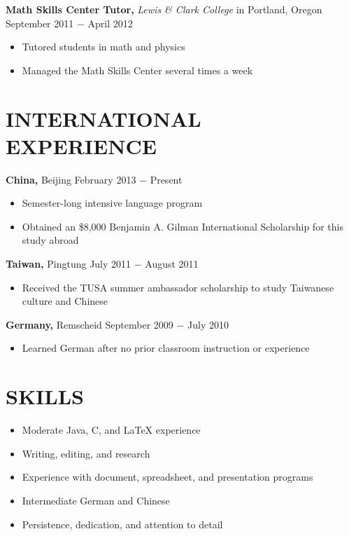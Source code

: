 \documentclass{res} %
\begin{document}
\begin{resume}
{\bf Math Skills Center Tutor,} {\it Lewis \& Clark College} in Portland, Oregon \hfill September 2011 $-$ April 2012 %
\begin{itemize}[label={--}]
	\item Tutored students in math and physics
	\item Managed the Math Skills Center several times a week
\end{itemize}

\section{INTERNATIONAL EXPERIENCE}

{\bf China,} Beijing \hfill February 2013 $-$ Present %
\begin{itemize}[label={--}]
	\item Semester-long intensive language program
	\item Obtained an \$8,000 Benjamin A. Gilman International Scholarship for this study abroad
\end{itemize}

{\bf Taiwan,} Pingtung \hfill July 2011 $-$ August 2011 %
\begin{itemize}[label={--}]
	\item Received the TUSA summer ambassador scholarship to study Taiwanese culture and Chinese
\end{itemize}

{\bf Germany,} Remscheid \hfill September 2009 $-$ July 2010 %
\begin{itemize}[label={--}]
	\item Learned German after no prior classroom instruction or experience
\end{itemize}

\section{SKILLS}

\begin{itemize}[label={--}]
	\item Moderate Java, C, and LaTeX experience
	\item Writing, editing, and research
	\item Experience with document, spreadsheet, and presentation programs
	\item Intermediate German and Chinese
	\item Persistence, dedication, and attention to detail
\end{itemize}

\end{resume}
\end{document}
